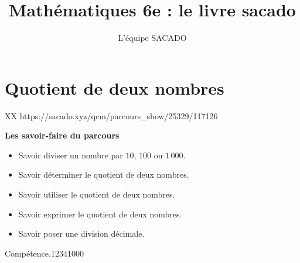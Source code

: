 



\title{Mathématiques 6e  : le livre sacado}
\author{L'équipe SACADO}




\chapter{Quotient de deux nombres}{XX} %
{https://sacado.xyz/qcm/parcours_show/25329/117126}
{
 \begin{CpsCol}
	\textbf{Les savoir-faire du parcours}
	\begin{itemize}
		\item Savoir diviser un nombre par $10$, $100$ ou $1\,000$.
		\item Savoir déterminer le quotient de deux nombres.
		\item Savoir utiliser le quotient de deux nombres.
		\item Savoir exprimer le quotient de deux nombres.
		\item Savoir poser une division décimale.
	\end{itemize}
 \end{CpsCol}

\begin{His}
\end{His}

\begin{ExoDec}{Compétence.}{1234}{1}{0}{0}{0}
\end{ExoDec}
}


